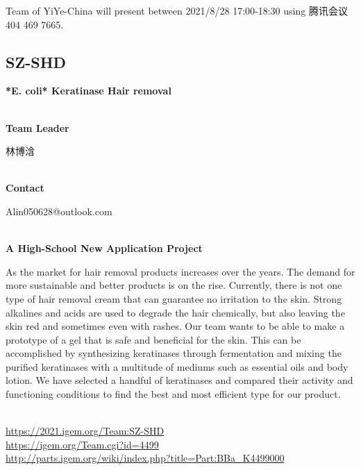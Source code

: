 \vfill{}









Team of YiYe-China will present between        2021/8/28 17:00-18:30 using 腾讯会议 404 469 7665.
\newpage


\subsection{\textcolor{Blu}{ SZ-SHD } }
\vspace{5mm}
\begin{center}
\large{
  \textbf{ *E. coli* Keratinase Hair removal }\\

}
\end{center}
\textbf{\\Team Leader}

  林博浛


\textbf{\\Contact}

  Alin050628@outlook.com


\textbf{\\A High-School New Application Project\\}\begin{spacing}{1.5}

As the market for hair removal products increases over the years. The demand for more sustainable and better products is on the rise. Currently, there is not one type of hair removal cream that can guarantee no irritation to the skin. Strong alkalines and acids are used to degrade the hair chemically, but also leaving the skin red and sometimes even with rashes. Our team wants to be able to make a prototype of a gel that is safe and beneficial for the skin. This can be accomplished by synthesizing keratinases through fermentation and mixing the purified keratinases with a multitude of mediums such as essential oils and body lotion. We have selected a handful of keratinases and compared their activity and functioning conditions to find the best and most efficient type for our product.\end{spacing}
\\

\url{https://2021.igem.org/Team:SZ-SHD }\\
\url{https://igem.org/Team.cgi?id=4499 }\\
\url{http://parts.igem.org/wiki/index.php?title=Part:BBa_K4499000 }\\


